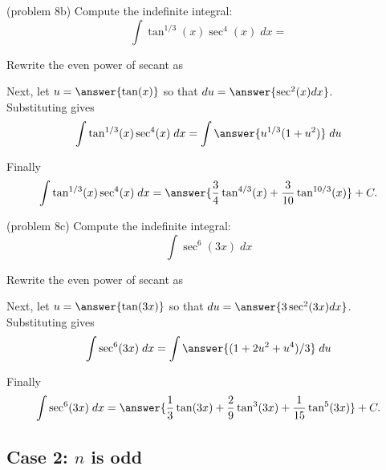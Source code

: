 \documentclass{ximera}
\begin{document}
\begin{problem}(problem 8b)
Compute the indefinite integral:
\[
\int \tan^{1/3}(x) \sec^4(x)\;dx = 
\]

Rewrite the even power of secant as

\begin{multipleChoice}
\end{multipleChoice}

Next, let $u = \answer{\tan(x)}$ so that $du = \answer{\sec^2(x) dx}$.\\

Substituting gives 
\[
\int \tan^{1/3}(x)\sec^4(x) \; dx= \int \answer{u^{1/3}(1+u^2)} \; du
\]

Finally 
\[
\int \tan^{1/3}(x)\sec^4(x) \; dx= \answer{\frac34 \tan^{4/3}(x) + \frac{3}{10} \tan^{10/3}(x)} + C.
\]

\end{problem}

\begin{problem}(problem 8c)
Compute the indefinite integral:
\[
\int  \sec^6(3x)\;dx
\]

Rewrite the even power of secant as

\begin{multipleChoice}
\end{multipleChoice}

Next, let $u = \answer{\tan(3x)}$ so that $du = \answer{3\sec^2(3x) dx}$.\\

Substituting gives 
\[
\int \sec^6(3x) \; dx= \int \answer{(1+ 2u^2 +u^4)/3} \; du
\]

Finally 
\[
\int \sec^6(3x) \; dx= \answer{\frac13 \tan(3x) + \frac29 \tan^3(3x) + \frac{1}{15}\tan^5(3x)} + C.
\]


\end{problem}




\subsection{Case 2: $n$ is odd}
\end{document}
